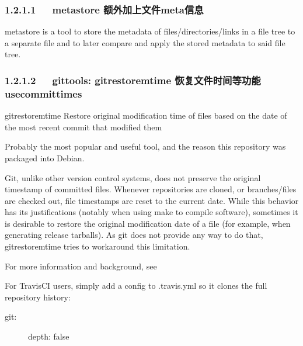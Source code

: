 \documentclass[letterpaper,12pt,english]{sphinxmanual}
\begin{document}
\subsubsection{1.2.1.1   metastore 额外加上文件meta信息}
\label{\detokenize{001software/001install/001._u7f51_u7ad9/github:metastore-meta}}

metastore is a tool to store the metadata of files/directories/links in a file tree to a separate file and to later compare and apply the stored metadata to said file tree.


\subsubsection{1.2.1.2   git\sphinxhyphen{}tools: git\sphinxhyphen{}restore\sphinxhyphen{}mtime 恢复文件时间等功能use\sphinxhyphen{}commit\sphinxhyphen{}times}
\label{\detokenize{001software/001install/001._u7f51_u7ad9/github:git-tools-git-restore-mtime-use-commit-times}}

git\sphinxhyphen{}restore\sphinxhyphen{}mtime
Restore original modification time of files based on the date of the most recent commit that modified them

Probably the most popular and useful tool, and the reason this repository was packaged into Debian.

Git, unlike other version control systems, does not preserve the original timestamp of committed files. Whenever repositories are cloned, or branches/files are checked out, file timestamps are reset to the current date. While this behavior has its justifications (notably when using make to compile software), sometimes it is desirable to restore the original modification date of a file (for example, when generating release tarballs). As git does not provide any way to do that, git\sphinxhyphen{}restore\sphinxhyphen{}mtime tries to workaround this limitation.

For more information and background, see 

For TravisCI users, simply add a config to .travis.yml so it clones the full repository history:
\begin{description}
\item[{git:}] \leavevmode
depth: false

\end{description}
\end{document}
